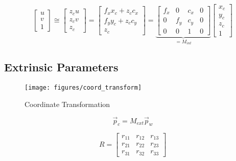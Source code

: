 \begin{equation}
    \begin{bmatrix}
        u \\ v \\ 1
    \end{bmatrix}
    \cong
    \begin{bmatrix}
        z_c u \\ z_c v \\ z_c
    \end{bmatrix}
    =
    \begin{bmatrix}
        f_x x_c + z_c c_x \\ f_y y_c + z_c c_y \\ z_c
    \end{bmatrix}
    =
    \underbrace{
        \begin{bmatrix}
            f_x & 0   & c_x & 0 \\
            0   & f_y & c_y & 0 \\
            0   & 0   & 1   & 0
        \end{bmatrix}
    }_{=M_{int}}
    \begin{bmatrix}
        x_c \\ y_c \\ z_c \\ 1
    \end{bmatrix}
\end{equation}

\subsection{Extrinsic Parameters}
\begin{figure}[h!]
    \centering
    \texttt{[image: figures/coord\_transform]}
    \caption{Coordinate Transformation}
\end{figure}

\begin{equation}
    \vec{p}_c = M_{ext}\vec{p}_w
\end{equation}

\begin{equation}
    R =
    \begin{bmatrix}
        r_{11} & r_{12} & r_{13} \\
        r_{21} & r_{22} & r_{23} \\
        r_{31} & r_{32} & r_{33}
    \end{bmatrix}
\end{equation}


